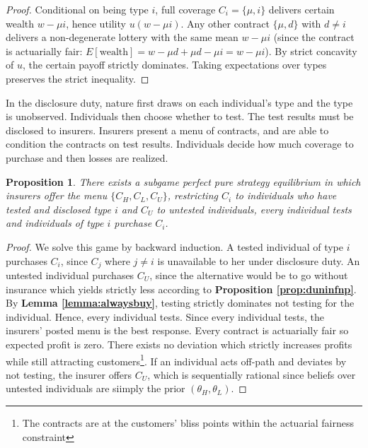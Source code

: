 \documentclass[nonatbib,preprint,12pt]{elsarticle}
\theoremstyle{plain}
\newtheorem{prop}[theorem]{Proposition}
\theoremstyle{definition}
\theoremstyle{plain}
\theoremstyle{TheoremNum}
\theoremstyle{CorollaryNum}
\theoremstyle{PropositionNum}
\theoremstyle{TheoremNum}
\begin{document}
\begin{proof}
    Conditional on being type $i$, full coverage $C_i = \{\mu,i\}$ delivers certain wealth $w-\mu i$, hence utility $u(w-\mu i)$. Any other contract $\{\mu,d\}$ with $d \neq i$ delivers a non-degenerate lottery with the same mean $w-\mu i$ (since the contract is actuarially fair: $E[\text{wealth}]=w-\mu d +\mu d -\mu i = w -\mu i$). By strict concavity of $u$, the certain payoff strictly dominates. Taking expectations over types preserves the strict inequality.
\end{proof}

In the disclosure duty, nature first draws on each individual's type and the type is unobserved. Individuals then choose whether to test. The test results must be disclosed to insurers. Insurers present a menu of contracts, and are able to condition the contracts on test results. Individuals decide how much coverage to purchase and then losses are realized.

\setcounter{theorem}{1}
\renewcommand{\thetheorem}{\arabic{theorem}}
\begin{prop}\label{prop:ddeqnoprinciple}
     There exists a subgame perfect pure strategy equilibrium in which insurers offer the menu $\{C_H, C_L, C_U\}$, restricting $C_i$ to individuals who have tested and disclosed type $i$ and $C_U$ to untested individuals, every individual tests and individuals of type $i$ purchase $C_i$.
\end{prop}

\begin{proof}
    We solve this game by backward induction. A tested individual of type $i$ purchases $C_i$, since $C_j$ where $j \neq i$ is unavailable to her under disclosure duty. An untested individual purchases $C_U$, since the alternative would be to go without insurance which yields strictly less according to \textbf{Proposition \ref{prop:duninfnp}}. By \textbf{Lemma \ref{lemma:alwaysbuy}}, testing strictly dominates not testing for the individual. Hence, every individual tests. Since every individual tests, the insurers' posted menu is the best response. Every contract is actuarially fair so expected profit is zero. There exists no deviation which strictly increases profits while still attracting customers\footnote{The contracts are at the customers' bliss points within the actuarial fairness constraint}. If an individual acts off-path and deviates by not testing, the insurer offers $C_U$, which is sequentially rational since beliefs over untested individuals are siimply the prior $(\theta_H, \theta_L)$.
\end{proof}
\end{document}
